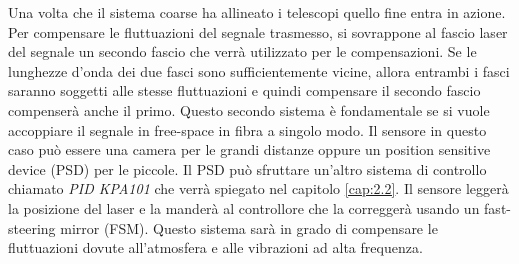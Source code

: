 Una volta che il sistema coarse ha allineato i telescopi quello fine entra in azione. Per compensare le fluttuazioni del segnale trasmesso, si sovrappone al fascio laser del segnale un secondo fascio che verrà utilizzato per le compensazioni. Se le lunghezze d'onda dei due fasci sono sufficientemente vicine, allora entrambi i fasci saranno soggetti alle stesse fluttuazioni e quindi compensare il secondo fascio compenserà anche il primo.
Questo secondo sistema è fondamentale se si vuole accoppiare il segnale in free-space in fibra a singolo modo.
Il sensore in questo caso può essere una camera per le grandi distanze oppure un position sensitive device (PSD) per le piccole. Il PSD può sfruttare un'altro sistema di controllo chiamato \textit{PID KPA101} che verrà spiegato nel capitolo \ref{cap:2.2}. Il sensore leggerà la posizione del laser e la manderà al controllore che la correggerà usando un fast-steering mirror (FSM). Questo sistema sarà in grado di compensare le fluttuazioni dovute all'atmosfera e alle vibrazioni ad alta frequenza.